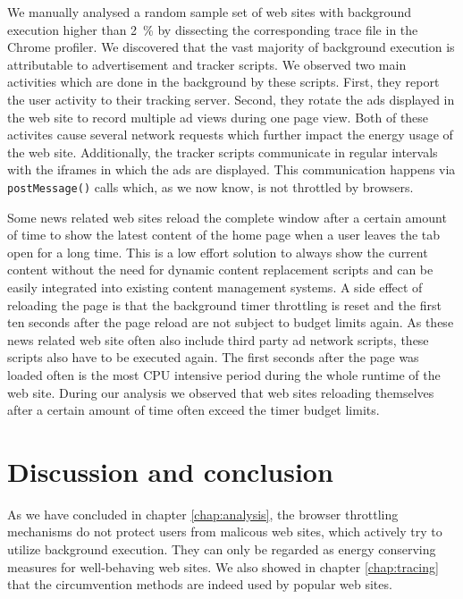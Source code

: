 \documentclass[
	ruledheaders=section,%
	class=report,%
	thesis={type=bachelor},%
	accentcolor=9c,%
	custommargins=true,%
	marginpar=false,%
	parskip=half-,%
	fontsize=11pt,%
]{tudapub}
\begin{document}
  We manually analysed a random sample set of web sites with background execution higher than 2~\% by dissecting the corresponding trace file in the Chrome profiler. We discovered that the vast majority of background execution is attributable to advertisement and tracker scripts. We observed two main activities which are done in the background by these scripts. First, they report the user activity to their tracking server. Second, they rotate the ads displayed in the web site to record multiple ad views during one page view. Both of these activites cause several network requests which further impact the energy usage of the web site. Additionally, the tracker scripts communicate in regular intervals with the iframes in which the ads are displayed. This communication happens via \texttt{postMessage()} calls which, as we now know, is not throttled by browsers.
  
  Some news related web sites reload the complete window after a certain amount of time to show the latest content of the home page when a user leaves the tab open for a long time. This is a low effort solution to always show the current content without the need for dynamic content replacement scripts and can be easily integrated into existing content management systems. A side effect of reloading the page is that the background timer throttling is reset and the first ten seconds after the page reload are not subject to budget limits again. As these news related web site often also include third party ad network scripts, these scripts also have to be executed again. The first seconds after the page was loaded often is the most CPU intensive period during the whole runtime of the web site. During our analysis we observed that web sites reloading themselves after a certain amount of time often exceed the timer budget limits.
  
  
  
  \newpage
  \chapter{Discussion and conclusion}

  As we have concluded in chapter \ref{chap:analysis}, the browser throttling mechanisms do not protect users from malicous web sites, which actively try to utilize background execution. They can only be regarded as energy conserving measures for well-behaving web sites. We also showed in chapter \ref{chap:tracing} that the circumvention methods are indeed used by popular web sites.
\end{document}
